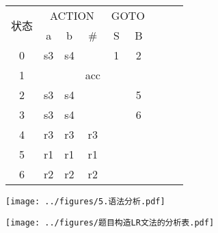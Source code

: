 \begin{table}[H]
    \centering
    \setlength{\tabcolsep}{4mm}
    \begin{tabular}{|c|c|c|c|c|c|c|c|c|}
        \hline
        \multirow{2}{*}{状态} & \multicolumn{3}{c|}{ACTION} & \multicolumn{2}{c|}{GOTO}               \\ \cline{2-6}
                              & a                           & b                         & \#  & S & B \\ \hline
        0                     & s3                          & s4                        &     & 1 & 2 \\ \hline
        1                     &                             &                           & acc &   &   \\ \hline
        2                     & s3                          & s4                        &     &   & 5 \\ \hline
        3                     & s3                          & s4                        &     &   & 6 \\ \hline
        4                     & r3                          & r3                        & r3  &   &   \\ \hline
        5                     & r1                          & r1                        & r1  &   &   \\ \hline
        6                     & r2                          & r2                        & r2  &   &   \\
        \hline
    \end{tabular}
\end{table}

\texttt{[image: ../figures/5.语法分析.pdf]}


\texttt{[image: ../figures/题目构造LR文法的分析表.pdf]}


\newpage